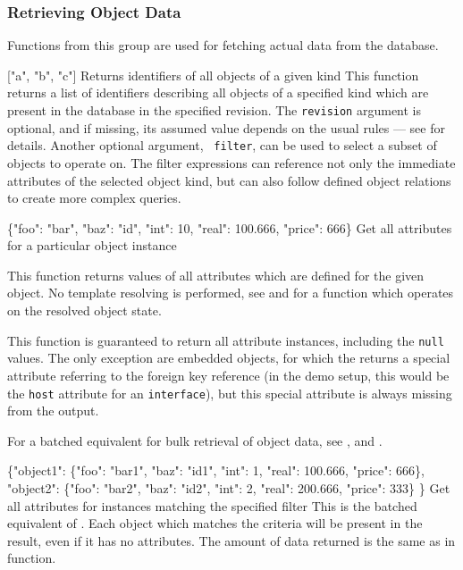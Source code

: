 \documentclass[deska]{subfiles}
\begin{document}
\subsubsection{Retrieving Object Data}
\label{sec:api-group-data-retrieval}

Functions from this group are used for fetching actual data from the database.

    { ["a", "b", "c"] }
    {Returns identifiers of all objects of a given kind}
    {This function returns a list of identifiers describing all objects of a specified kind which are present in the
    database in the specified revision.  The {\tt revision} argument is optional, and if missing, its assumed value
    depends on the usual rules --- see  for details.  Another optional argument, {\tt
    filter}, can be used to select a subset of objects to operate on.  The filter expressions can reference not only the
    immediate attributes of the selected object kind, but can also follow defined object relations to create more
    complex queries.  \deskaUnsortedRes}

    {\{"foo": "bar", "baz": "id", "int": 10, "real": 100.666, "price": 666\}}
    {Get all attributes for a particular object instance}
    {This function returns values of all attributes which are defined for the given object.  No template resolving is
    performed, see  and  for a function
    which operates on the resolved object state.

    This function is guaranteed to return all attribute instances, including the {\tt null} values.  The only exception are
    embedded objects, for which the  returns a special attribute referring to the foreign
    key reference (in the demo setup, this would be the {\tt host} attribute for an {\tt interface}), but this special
    attribute is always missing from the  output.

    For a batched equivalent for bulk retrieval of object data, see ,
     and .

    \deskaUnsortedRes
    }

    {\{"object1": \{"foo": "bar1", "baz": "id1", "int": 1, "real": 100.666, "price": 666\}, \\
       "object2": \{"foo": "bar2", "baz": "id2", "int": 2, "real": 200.666, "price": 333\}
      \}}
    {Get all attributes for instances matching the specified filter}
    {This is the batched equivalent of .  Each object which matches the criteria will be
    present in the result, even if it has no attributes.  The amount of data returned is the same as in
     function.  \deskaUnsortedRes}
\end{document}
